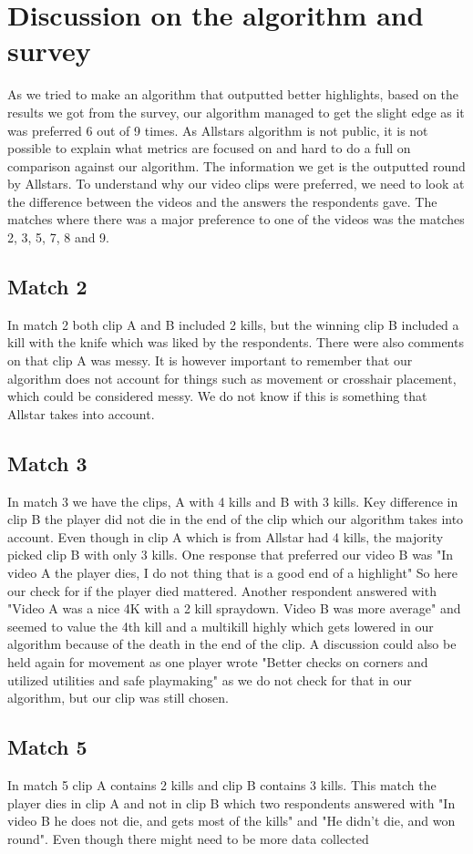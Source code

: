 \section{Discussion on the algorithm and survey}
As we tried to make an algorithm that outputted better highlights, based on the results we got from the survey, our algorithm managed to get the slight edge as it was preferred 6 out of 9 times. As Allstars algorithm is not public, it is not possible to explain what metrics are focused on and hard to do a full on comparison against our algorithm. The information we get is the outputted round by Allstars. To understand why our video clips were preferred, we need to look at the difference between the videos and the answers the respondents gave. The matches where there was a major preference to one of the videos was the matches 2, 3, 5, 7, 8 and 9. 
\subsection{Match 2}
In match 2 both clip A and B included 2 kills, but the winning clip B included a kill with the knife which was liked by the respondents. There were also comments on that clip A was messy. It is however important to remember that our algorithm does not account for things such as movement or crosshair placement, which could be considered messy. We do not know if this is something that Allstar takes into account.
\subsection{Match 3}
In match 3 we have the clips, A with 4 kills and B with 3 kills. Key difference in clip B the player did not die in the end of the clip which our algorithm takes into account. Even though in clip A which is from Allstar had 4 kills, the majority picked clip B with only 3 kills. One response that preferred our video B was "In video A the player dies, I do not thing that is a good end of a highlight" So here our check for if the player died mattered. Another respondent answered with "Video A was a nice 4K with a 2 kill spraydown. Video B was more average" and seemed to value the 4th kill and a multikill highly which gets lowered in our algorithm because of the death in the end of the clip. A discussion could also be held again for movement as one player wrote "Better checks on corners and utilized utilities and safe playmaking" as we do not check for that in our algorithm, but our clip was still chosen.
\subsection{Match 5}
In match 5 clip A contains 2 kills and clip B contains 3 kills. This match the player dies in clip A and not in clip B which two respondents answered with "In video B he does not die, and gets most of the kills" and "He didn't die, and won round". Even though there might need to be more data collected 
